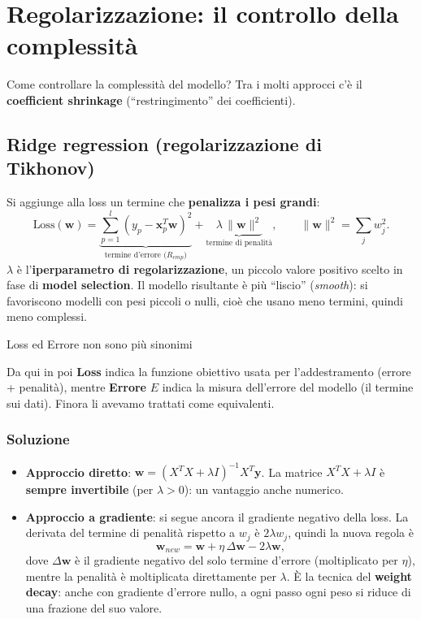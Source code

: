 \section{Regolarizzazione: il controllo della
complessità}\label{regolarizzazione-il-controllo-della-complessituxe0}

Come controllare la complessità del modello? Tra i molti approcci c'è il
\textbf{coefficient shrinkage} (``restringimento'' dei coefficienti).

\subsection{Ridge regression (regolarizzazione di
Tikhonov)}\label{ridge-regression-regolarizzazione-di-tikhonov}

Si aggiunge alla loss un termine che \textbf{penalizza i pesi grandi}:
\[
\text{Loss}(\mathbf{w}) = \underbrace{\sum_{p=1}^{l}(y_p - \mathbf{x}_p^T\mathbf{w})^2}_{\text{termine d'errore (} R_{emp}\text{)}} + \underbrace{\lambda\,\|\mathbf{w}\|^2}_{\text{termine di penalità}}, \qquad \|\mathbf{w}\|^2 = \sum_j w_j^2.
\] \(\lambda\) è l'\textbf{iperparametro di regolarizzazione}, un
piccolo valore positivo scelto in fase di \textbf{model selection}. Il
modello risultante è più ``liscio'' (\emph{smooth}): si favoriscono
modelli con pesi piccoli o nulli, cioè che usano meno termini, quindi
meno complessi.

\begin{boxnote}{Loss ed Errore non sono più sinonimi}

Da qui in poi \textbf{Loss} indica la funzione obiettivo usata per
l'addestramento (errore + penalità), mentre \textbf{Errore} \(E\) indica
la misura dell'errore del modello (il termine sui dati). Finora li
avevamo trattati come equivalenti.

\end{boxnote}

\subsubsection{Soluzione}\label{soluzione}

\begin{itemize}
\tightlist
\item
  \textbf{Approccio diretto}:
  \(\mathbf{w} = (X^TX + \lambda I)^{-1}X^T\mathbf{y}\). La matrice
  \(X^TX + \lambda I\) è \textbf{sempre invertibile} (per
  \(\lambda > 0\)): un vantaggio anche numerico.
\item
  \textbf{Approccio a gradiente}: si segue ancora il gradiente negativo
  della loss. La derivata del termine di penalità rispetto a \(w_j\) è
  \(2\lambda w_j\), quindi la nuova regola è \[
  \mathbf{w}_{new} = \mathbf{w} + \eta\,\Delta\mathbf{w} - 2\lambda\mathbf{w},
  \] dove \(\Delta\mathbf{w}\) è il gradiente negativo del solo termine
  d'errore (moltiplicato per \(\eta\)), mentre la penalità è
  moltiplicata direttamente per \(\lambda\). È la tecnica del
  \textbf{weight decay}: anche con gradiente d'errore nullo, a ogni
  passo ogni peso si riduce di una frazione del suo valore.
\end{itemize}

